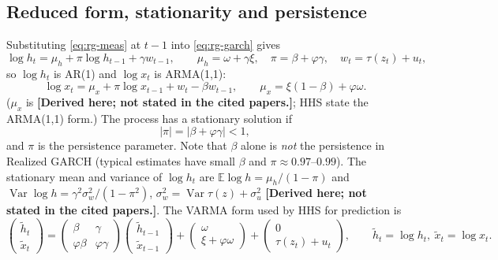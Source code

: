 \documentclass[11pt]{article}
\newcommand{\E}{\mathbb{E}}
\newcommand{\Var}{\operatorname{Var}}
\newcommand{\lh}{\tilde h}
\newcommand{\lx}{\tilde x}
\newcommand{\derived}{\textbf{[Derived here; not stated in the cited papers.]}}
\begin{document}
\subsection{Reduced form, stationarity and persistence}
Substituting \eqref{eq:rg-meas} at $t-1$ into \eqref{eq:rg-garch} gives \cite{HHS2012}
\begin{equation}\label{eq:rg-reduced}
\log h_t = \mu_h + \pi \log h_{t-1} + \gamma w_{t-1}, \qquad
\mu_h=\omega+\gamma\xi,\quad \pi=\beta+\varphi\gamma,\quad w_t=\tau(z_t)+u_t ,
\end{equation}
so $\log h_t$ is AR(1) and $\log x_t$ is ARMA(1,1):
\begin{equation}\label{eq:rg-x-arma}
\log x_t = \mu_x + \pi\log x_{t-1} + w_t - \beta w_{t-1}, \qquad \mu_x = \xi(1-\beta)+\varphi\omega .
\end{equation}
($\mu_x$ is \derived; HHS state the ARMA(1,1) form.) The process has a stationary solution if
\begin{equation}\label{eq:rg-stat}
|\pi| = |\beta+\varphi\gamma| < 1 ,
\end{equation}
and $\pi$ is the persistence parameter. Note that $\beta$ alone is \emph{not} the persistence
in Realized GARCH (typical estimates have small $\beta$ and $\pi\approx0.97$--$0.99$).
The stationary mean and variance of $\log h_t$ are
$\E\log h=\mu_h/(1-\pi)$ and $\Var\log h=\gamma^2\sigma_w^2/(1-\pi^2)$,
$\sigma_w^2=\Var\tau(z)+\sigma_u^2$ \derived.
The VARMA form used by HHS for prediction is
\begin{equation}\label{eq:rg-var}
\begin{pmatrix}\lh_t\\ \lx_t\end{pmatrix}
=\begin{pmatrix}\beta&\gamma\\ \varphi\beta&\varphi\gamma\end{pmatrix}
\begin{pmatrix}\lh_{t-1}\\ \lx_{t-1}\end{pmatrix}
+\begin{pmatrix}\omega\\ \xi+\varphi\omega\end{pmatrix}
+\begin{pmatrix}0\\ \tau(z_t)+u_t\end{pmatrix},\qquad \lh_t=\log h_t,\ \lx_t=\log x_t .
\end{equation}
\end{document}

